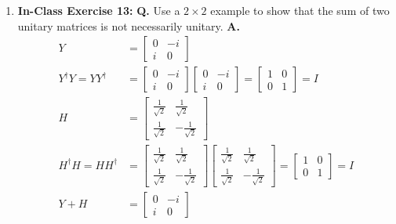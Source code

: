 \documentclass[main.tex]{subfiles}
\begin{document}
\begin{enumerate}
\item[] \textbf{In-Class Exercise 13:} \textbf{Q.} Use a $2 \times 2$ example to show that the sum of two unitary matrices is not necessarily unitary. \textbf{A.}
    \begin{align*}
        Y                                           & = \left[\begin{array}{cc} 0 & -i \\ i & 0 \end{array}\right]\\
        Y^{\dagger} Y = Y Y^{\dagger}               & = \left[\begin{array}{cc} 0 & -i \\ i & 0 \end{array}\right] \left[\begin{array}{cc} 0 & -i \\ i & 0 \end{array}\right]
                                                    = \left[\begin{array}{cc} 1 & 0 \\ 0 & 1 \end{array}\right]
                                                    = I\\
        H                                           & = \left[\begin{array}{cc} \frac{1}{\sqrt{2}} & \frac{1}{\sqrt{2}} \\ \frac{1}{\sqrt{2}} & -\frac{1}{\sqrt{2}} \end{array} \right]\\
        H^{\dagger} H = H H^{\dagger}               & = \left[\begin{array}{cc} \frac{1}{\sqrt{2}} & \frac{1}{\sqrt{2}} \\ \frac{1}{\sqrt{2}} & -\frac{1}{\sqrt{2}} \end{array} \right]
                                                    \left[\begin{array}{cc} \frac{1}{\sqrt{2}} & \frac{1}{\sqrt{2}} \\ \frac{1}{\sqrt{2}} & -\frac{1}{\sqrt{2}} \end{array} \right]
                                                    = \left[\begin{array}{cc} 1 & 0 \\ 0 & 1 \end{array}\right]
                                                    = I\\
        Y + H                                       & = \left[\begin{array}{cc} 0 & -i \\ i & 0 \end{array}\right] 

\end{align*}
\end{enumerate}
\end{document}
